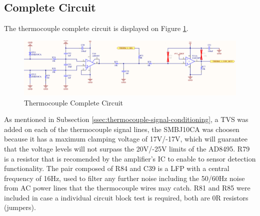 	\subsection{Complete Circuit}\label{ssec:thermocouple-complete-circuit}
		The thermocouple complete circuit is displayed on Figure \ref{fig:thermocouple-complete-circuit}.

		\begin{figure}[htbp]
			\centering
				\includegraphics[scale=0.7]{figuras/fig-thermocouple-complete-circuit}
			\caption{Thermocouple Complete Circuit \cite{thermocouple-complete-conditioning-protection-circuit}}
			\label{fig:thermocouple-complete-circuit}
		\end{figure}		

		As mentioned in Subsection \ref{ssec:thermocouple-signal-conditioning}, a TVS was added on each of the thermocouple signal lines, the SMBJ10CA \cite{smbj10ca-datasheet} was choosen because it has a maximum clamping voltage of 17V/-17V, which will guarantee that the voltage levels will not surpass the 20V/-25V limits of the AD8495. R79 is a resistor that is recomended by the amplifier's IC to enable to sensor detection functionality. The pair composed of R84 and C39 is a LFP with a central frequency of 16Hz, used to filter any further noise including the 50/60Hz noise from AC power lines that the thermocouple wires may catch. R81 and R85 were included in case a individual circuit block test is required, both are 0R resistors (jumpers).